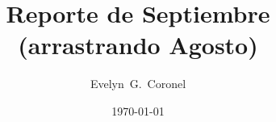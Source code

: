 



\title{Reporte de Septiembre (arrastrando Agosto)}
\author{Evelyn~G.~Coronel}


\date[]{\lowercase{\today}} %


\maketitle


